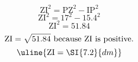 \[\text{ZI}^{2}=\text{PZ}^{2}-\text{IP}^{2}\]
\[\text{ZI}^{2}=17^{2}-15.4^{2}\]
\[\text{ZI}^{2}=51.84\]
\[\text{ZI}=\sqrt{\mathstrut 51.84}\text{ because ZI is positive.}\]
\[\uline{\text{ZI}=\SI{7.2}{dm}}\]